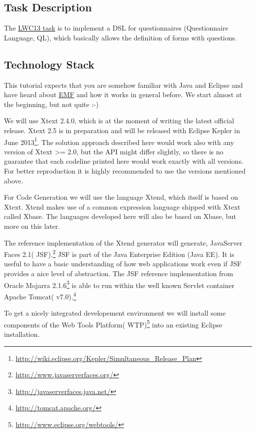 \subsection{Task Description}
The {\href{http://www.languageworkbenches.net/images/5/53/Ql.pdf}{LWC13 task}}
is to implement a DSL for questionnaires (Questionnaire Language, QL), which
basically allows the definition of forms with questions.


\subsection{Technology Stack}
This tutorial expects that you are somehow familiar with Java and Eclipse and
have heard about \url{EMF} and how it works in general before. We start almost at the
beginning, but not quite :-) 

We will use Xtext 2.4.0, which is at the moment of writing the latest official
release.
Xtext 2.5 is in preparation and will be released with Eclipse Kepler in June
2013\footnote{\url{http://wiki.eclipse.org/Kepler/Simultaneous_Release_Plan}}.
The solution approach described here would work also with any version
of Xtext >= 2.0, but the API might differ slightly, so there is no guarantee
that each codeline printed here would work exactly with all versions. For better
reproduction it is highly recommended to use the versions mentioned above.

For Code Generation we will use the language Xtend, which itself is based on
Xtext. Xtend makes use of a common expression language shipped with Xtext called
Xbase. The languages developed here will also be based on Xbase, but more on
this later.

The reference implementation of the Xtend generator will generate, 
JavaServer Faces 2.1( JSF).\footnote{\url{http://www.javaserverfaces.org/}} 
JSF is part of the Java Enterprise Edition (Java EE). It is useful to have a 
basic understanding of how web applications work even if JSF provides a nice level 
of abstraction. The JSF reference implementation from 
Oracle Mojarra 2.1.6\footnote{\url{http://javaserverfaces.java.net/}} is able to run 
within the well known Servlet container Apache Tomcat( v7.0).\footnote{\url{http://tomcat.apache.org/}} 

To get a nicely integrated developement environment we will install some components of the
Web Tools Platform( WTP)\footnote{\url{http://www.eclipse.org/webtools/}} into an existing Eclipse installation.